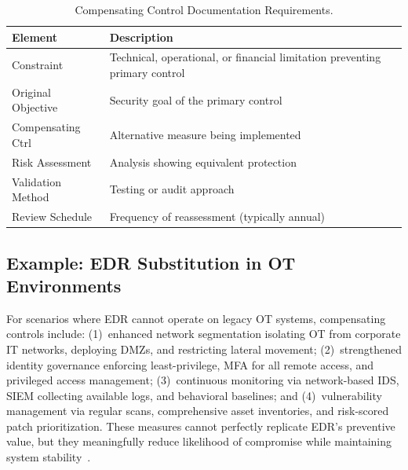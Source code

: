 \documentclass[sigconf,nonacm]{acmart}
\begin{document}
\begin{table}[h]
\caption{Compensating Control Documentation Requirements.}
\label{tab:documentation}
\small
\begin{tabularx}{\columnwidth}{@{}p{2.2cm}X@{}}
\toprule
\textbf{Element} & \textbf{Description} \\
\midrule
Constraint         & Technical, operational, or financial limitation preventing
                     primary control \\
\addlinespace[3pt]
Original Objective & Security goal of the primary control \\
\addlinespace[3pt]
Compensating Ctrl  & Alternative measure being implemented \\
\addlinespace[3pt]
Risk Assessment    & Analysis showing equivalent protection \\
\addlinespace[3pt]
Validation Method  & Testing or audit approach \\
\addlinespace[3pt]
Review Schedule    & Frequency of reassessment (typically annual) \\
\bottomrule
\end{tabularx}
\end{table}

\subsection{Example: EDR Substitution in OT Environments}

For scenarios where EDR cannot operate on legacy OT systems, compensating controls
include: (1)~enhanced network segmentation isolating OT from corporate IT networks,
deploying DMZs, and restricting lateral movement; (2)~strengthened identity governance
enforcing least-privilege, MFA for all remote access, and privileged access management;
(3)~continuous monitoring via network-based IDS, SIEM collecting available logs, and
behavioral baselines; and (4)~vulnerability management via regular scans, comprehensive
asset inventories, and risk-scored patch prioritization. These measures cannot perfectly
replicate EDR's preventive value, but they meaningfully reduce likelihood of compromise
while maintaining system stability~\cite{kelley2023}.
\end{document}
